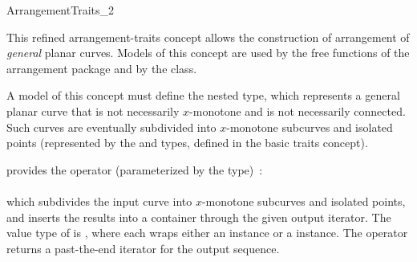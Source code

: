 
\ccRefPageBegin

\begin{ccRefConcept}{ArrangementTraits_2}

\ccDefinition

This refined arrangement-traits concept allows the construction of arrangement
of {\sl general} planar curves. Models of this concept are used
by the free  functions of the arrangement package and
by the  class.

A model of this concept must define the nested  type, which
represents a general planar curve that is not necessarily $x$-monotone
and is not necessarily connected. Such curves are eventually subdivided into
$x$-monotone subcurves and isolated points (represented by the 
and  types, defined in the basic traits concept).

\ccRefines
{}

\ccTypes



\ccThreeToTwo

{provides the operator (parameterized by the  type)~: \\
  \\
 which subdivides the input curve  into $x$-monotone subcurves and
 isolated points, and inserts the results into a container through the
 given output iterator. The value type of  is
 , where each  wraps either an
  instance or a  instance. The
 operator returns a past-the-end iterator for the output sequence.}

\ccCreation
{}


\end{ccRefConcept}
